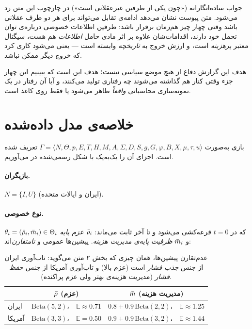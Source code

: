 \documentclass[12pt,a4paper]{article}
\begin{document}
جواب ساده‌انگارانه («چون یکی از طرفین غیرعقلانی است») در چارچوب این متن رد
می‌شود. متن پیوست نشان می‌دهد ادامه‌ی تقابل می‌تواند برای هر دو طرف
عقلانی باشد وقتی چهار چیز هم‌زمان برقرار باشد: طرفین اطلاعات خصوصی درباره‌ی
توان تحمل خود دارند، اقدامات‌شان علاوه بر اثر مادی حامل \emph{اطلاعات} هم
هست، سیگنال معتبر \emph{پرهزینه} است، و ارزش خروج به \emph{تاریخچه} وابسته
است — یعنی می‌شود کاری کرد که خروج دیگر ممکن نباشد.

هدف این گزارش دفاع از هیچ موضع سیاسی نیست؛ هدف این است که ببینیم این چهار
جزء وقتی کنار هم گذاشته می‌شوند چه رفتاری تولید می‌کنند، و آیا آن رفتار در یک
نمونه‌سازی محاسباتی \emph{واقعاً} ظاهر می‌شود یا فقط روی کاغذ است.

\section{خلاصه‌ی مدل داده‌شده}\label{sec:model}

بازی به‌صورت
$\Gamma=\langle N,\Theta,p,E,T,H,M,A,\Sigma,D,S,g,G,\varphi,B,X,\mu,\tau,u\rangle$
تعریف شده است. اجزای آن را یک‌به‌یک با شکل رسمی‌شده در
 می‌آوریم.

\paragraph{بازیگران.} $N=\{I,U\}$ (ایران و ایالات متحده).

\paragraph{نوع خصوصی.}
$\theta_i=(\bar{\rho}_i,\bar{m}_i)\in\Theta_i$ که در $t=0$ قرعه‌کشی می‌شود و تا آخر
ثابت می‌ماند: $\bar{\rho}_i$ \emph{عزم پایه} و $\bar{m}_i$ \emph{ظرفیت پایه‌ی مدیریت
هزینه}. پیشین‌ها عمومی و \emph{نامتقارن}‌اند:

\begin{table}[h]\centering
\begin{tabular}{lcc}
\toprule
 & $\bar{\rho}$ (عزم) & $\bar{m}$ (مدیریت هزینه)\\
\midrule
ایران & $\mathrm{Beta}(5,2)$،\ \ $\mathbb{E}\approx0.71$ &
        $0.8+0.9\,\mathrm{Beta}(2,2)$،\ \ $\mathbb{E}\approx1.25$\\
آمریکا & $\mathrm{Beta}(3,3)$،\ \ $\mathbb{E}=0.50$ &
        $0.9+0.9\,\mathrm{Beta}(3,2)$،\ \ $\mathbb{E}\approx1.44$\\
\bottomrule
\end{tabular}
\caption{عدم‌تقارن پیشین‌ها، همان چیزی که بخش ۲ متن می‌گوید: تاب‌آوری ایران از جنس
\emph{جذب فشار} است (عزم بالا) و تاب‌آوری آمریکا از جنس \emph{حفظ فشار}
(مدیریت هزینه‌ی بهتر ولی عزم پراکنده).}
\end{table}
\end{document}
